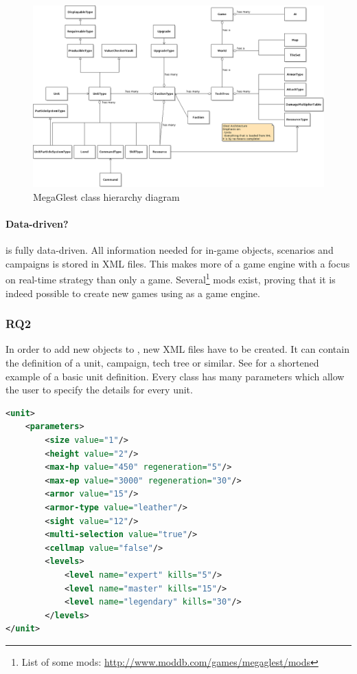 \begin{figure}[h!]
    \centering
    \includegraphics[angle=90,width=\textwidth]{pics/gamehierarchy}
    \caption{MegaGlest class hierarchy diagram}
    \label{fig:glestclassh}
\end{figure}

\paragraph{Data-driven?}
\GLEST{} is fully data-driven. All information needed for in-game objects, scenarios and campaigns is stored in XML files.
This makes \GLEST{} more of a game engine with a focus on real-time strategy than only a game. Several\footnote{List of
some mods: \url{http://www.moddb.com/games/megaglest/mods}} mods exist, proving that it is indeed possible to create new
games using \GLEST{} as a game engine. 

\subsubsection{RQ2}
In order to add new objects to \GLEST{}, new XML files have to be created. It can contain the definition of a unit, campaign,
tech tree or similar. See  for a shortened example of a basic unit definition. Every class has many
parameters which allow the user to specify the details for every unit. 

\begin{lstlisting}[language=XML,caption=A basic \GLEST{} (shortened) unit definition in XML, label=glestxml]
<unit>
	<parameters>
		<size value="1"/>
		<height value="2"/>
		<max-hp value="450" regeneration="5"/>
		<max-ep value="3000" regeneration="30"/>
		<armor value="15"/>	
		<armor-type value="leather"/>
		<sight value="12"/>
		<multi-selection value="true"/>	
		<cellmap value="false"/>
		<levels>
			<level name="expert" kills="5"/>
			<level name="master" kills="15"/>
			<level name="legendary" kills="30"/>
		</levels>
</unit>
\end{lstlisting}

